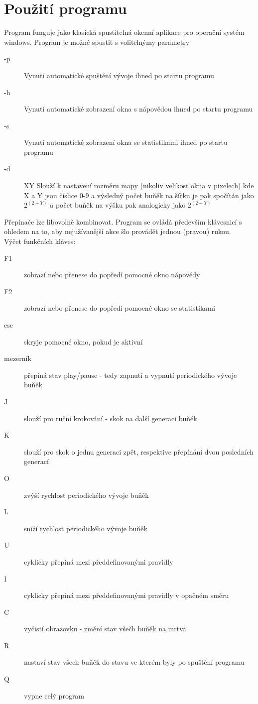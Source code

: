 \documentclass[11pt,a4paper,titlepage]{article}
\begin{document}
\newpage
\section{Použití programu}
Program funguje jako klasická spustitelná okenní aplikace pro operační systém windows.
Program je možné spustit s volitelnýmy parametry
\begin{description}
\item[-p] Vynutí automatické spuštění vývoje ihned po startu programu
\item[-h] Vynutí automatické zobrazení okna s nápovědou ihned po startu programu
\item[-s] Vynutí automatické zobrazení okna se statistikami ihned po startu programu
\item[-d] XY Slouží k nastavení rozměru mapy (nikoliv velikost okna v pixelech) kde X a Y jsou číslice 0-9 a 
výsledný počet buňěk na šířku je pak spočítán jako $2^{(2+Y)}$ a počet buňěk na výšku pak analogicky jako $2^{(2+Y)}$
\end{description}
Přepínače lze libovolně kombinovat.
\medskip
\medskip
Program se ovládá především klávesnicí s ohledem na to, aby nejužívanější akce šlo provádět jednou (pravou) rukou.\\
Výčet funkčních kláves:

\begin{description}
\item[F1] zobrazí nebo přenese do popředí pomocné okno nápovědy
\item[F2] zobrazí nebo přenese do popředí pomocné okno se statistikami
\item[esc] skryje pomocné okno, pokud je aktivní
\medskip
\item[mezerník] přepíná stav play/pause - tedy zapnutí a vypnutí periodického vývoje buňěk
\item[J] slouží pro ruční krokování - skok na další generaci buňěk
\item[K] slouží pro skok o jednu generaci zpět, respektive přepínání dvou posledních generací
\item[O] zvýší rychlost periodického vývoje buňěk
\item[L] sníží rychlost periodického vývoje buňěk
\item[U] cyklicky přepíná mezi předdefinovanými pravidly
\item[I] cyklicky přepíná mezi předdefinovanými pravidly v opačném směru
\medskip
\item[C] vyčistí obrazovku - změní stav všečh buňěk na mrtvá
\item[R] nastaví stav všech buňěk do stavu ve kterém byly po spuštění programu
\item[Q] vypne celý program 
\end{description}
\end{document}
